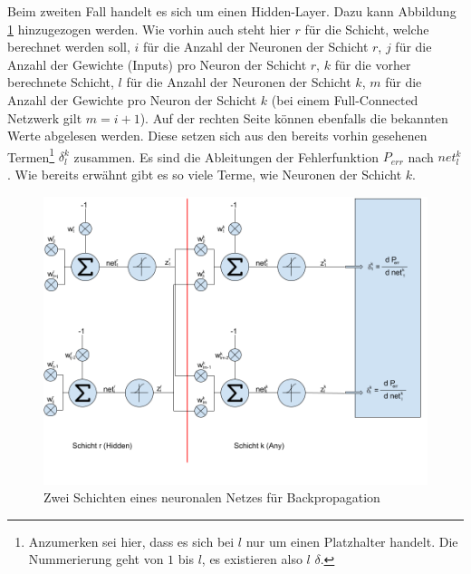\newpage
Beim zweiten Fall handelt es sich um einen Hidden-Layer. Dazu kann Abbildung \ref{fig:09_backpropagation_hidden} hinzugezogen
werden. Wie vorhin auch steht hier $r$ für die Schicht, welche berechnet werden soll, $i$ für die Anzahl der Neuronen
der Schicht $r$, $j$ für die Anzahl der Gewichte (Inputs) pro Neuron der Schicht $r$, $k$ für die vorher berechnete
Schicht, $l$ für die Anzahl der Neuronen der Schicht $k$, $m$ für die Anzahl der Gewichte pro Neuron der Schicht $k$ (bei einem
Full-Connected Netzwerk gilt $m = i + 1$). Auf der rechten Seite können ebenfalls die bekannten Werte abgelesen werden.
Diese setzen sich aus den bereits vorhin gesehenen Termen\footnote{Anzumerken sei hier, dass es sich bei $l$ nur
um einen Platzhalter handelt. Die Nummerierung geht von $1$ bis $l$, es existieren also $l$ $\delta$.} $\delta_l^k$ zusammen. Es sind die Ableitungen der
Fehlerfunktion $P_{err}$ nach $net_l^k$. Wie bereits erwähnt gibt es so viele Terme, wie Neuronen der Schicht $k$.
\begin{figure}[h!]
    \begin{center}
        \includegraphics[width=1\linewidth]{../common/01_neuronal_network/00_resources/05_backpropagation_hidden.png}
    \end{center}
    \caption{Zwei Schichten eines neuronalen Netzes für Backpropagation}
    \label{fig:09_backpropagation_hidden}
\end{figure}

